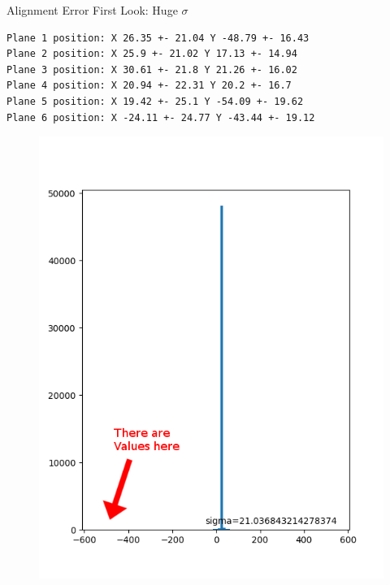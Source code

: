 \documentclass{beamer}
\begin{document}
\begin{frame}[fragile]{Alignment Error}
    \LARGE First Look: \normalsize Huge \( \sigma \) 
    \begin{lstlisting}
Plane 1 position: X 26.35 +- 21.04 Y -48.79 +- 16.43
Plane 2 position: X 25.9 +- 21.02 Y 17.13 +- 14.94
Plane 3 position: X 30.61 +- 21.8 Y 21.26 +- 16.02
Plane 4 position: X 20.94 +- 22.31 Y 20.2 +- 16.7
Plane 5 position: X 19.42 +- 25.1 Y -54.09 +- 19.62
Plane 6 position: X -24.11 +- 24.77 Y -43.44 +- 19.12
    \end{lstlisting}
    \begin{minipage}{.49\textwidth}
	\begin{figure}[H]
	\centering
	\includegraphics[trim=0 0 0 50, clip, width=.8\textwidth]{Beforeimasked_Witharrow.png}
	\end{figure}
    \end{minipage}
    \begin{minipage}{.49\textwidth}
	\begin{figure}[H]
	\centering

\end{figure}
\end{minipage}
\end{frame}
\end{document}
